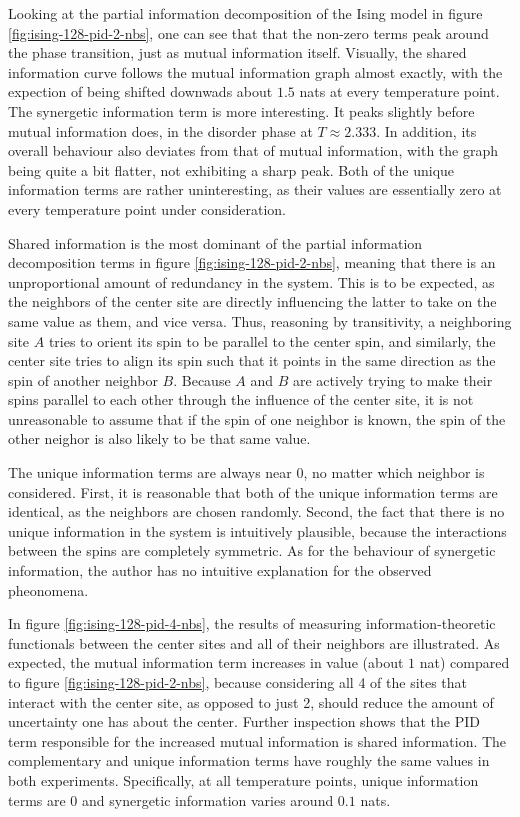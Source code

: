 \documentclass[12pt]{article}
\begin{document}
Looking at the partial information decomposition of the Ising model in figure \ref{fig:ising-128-pid-2-nbs}, one can see that that the non-zero terms peak around the phase transition, just as mutual information itself. Visually, the shared information curve follows the mutual information graph almost exactly, with the expection of being shifted downwads about $1.5$ nats at every temperature point. The synergetic information term is more interesting. It peaks slightly before mutual information does, in the disorder phase at $T \approx 2.333$. In addition, its overall behaviour also deviates from that of mutual information, with the graph being quite a bit flatter, not exhibiting a sharp peak. Both of the unique information terms are rather uninteresting, as their values are essentially zero at every temperature point under consideration. 

Shared information is the most dominant of the partial information decomposition terms in figure \ref{fig:ising-128-pid-2-nbs}, meaning that there is an unproportional amount of redundancy in the system. This is to be expected, as the neighbors of the center site are directly influencing the latter to take on the same value as them, and vice versa. Thus, reasoning by transitivity, a neighboring site $A$ tries to orient its spin to be parallel to the center spin, and similarly, the center site tries to align its spin such that it points in the same direction as the spin of another neighbor $B$. Because $A$ and $B$ are actively trying to make their spins parallel to each other through the influence of the center site, it is not unreasonable to assume that if the spin of one neighbor is known, the spin of the other neighor is also likely to be that same value. 

The unique information terms are always near 0, no matter which neighbor is considered. First, it is reasonable that both of the unique information terms are identical, as the neighbors are chosen randomly. Second, the fact that there is no unique information in the system is intuitively plausible, because the interactions between the spins are completely symmetric. As for the behaviour of synergetic information, the author has no intuitive explanation for the observed pheonomena. 

In figure \ref{fig:ising-128-pid-4-nbs}, the results of measuring information-theoretic functionals between the center sites and all of their neighbors are illustrated. As expected, the mutual information term increases in value (about $1$ nat) compared to figure \ref{fig:ising-128-pid-2-nbs}, because considering all 4 of the sites that interact with the center site, as opposed to just 2, should reduce the amount of uncertainty one has about the center. Further inspection shows that the PID term responsible for the increased mutual information is shared information. The complementary and unique information terms have roughly the same values in both experiments. Specifically, at all temperature points, unique information terms are $0$ and synergetic information varies around $0.1$ nats. 
\end{document}

